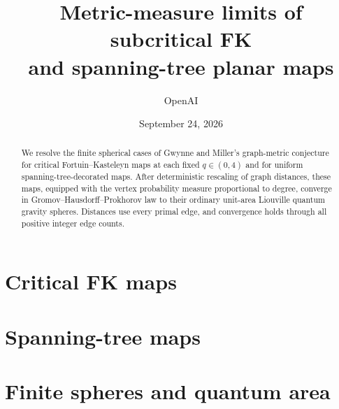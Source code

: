 \documentclass[11pt]{article}
\title{Metric-measure limits of subcritical FK\\and spanning-tree planar maps}
\author{OpenAI}
\date{September 24, 2026}
\begin{document}
\maketitle
\begin{abstract}
We resolve the finite spherical cases of Gwynne and Miller's graph-metric
conjecture for critical Fortuin--Kasteleyn maps at each fixed
\(q\in(0,4)\) and for uniform spanning-tree-decorated maps. After deterministic
rescaling of graph distances, these maps, equipped with the vertex
probability measure proportional to degree, converge in
Gromov--Hausdorff--Prokhorov law to their ordinary unit-area Liouville
quantum gravity spheres. Distances use every primal edge, and convergence
holds through all positive integer edge counts.
\end{abstract}
\tableofcontents


\part{Critical FK maps}









\part{Spanning-tree maps}





\part{Finite spheres and quantum area}


\begingroup
\small


\endgroup
\end{document}
